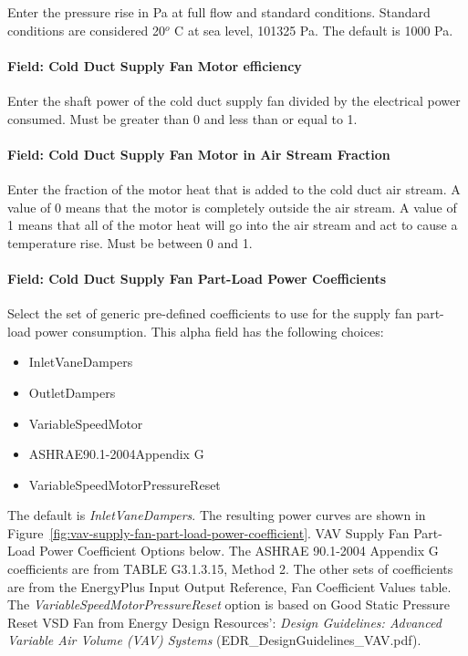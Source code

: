 Enter the pressure rise in Pa at full flow and standard conditions. Standard conditions are considered 20\(^{o}\) C at sea level, 101325 Pa. The default is 1000 Pa.

\paragraph{Field: Cold Duct Supply Fan Motor efficiency}\label{field-cold-duct-supply-fan-motor-efficiency}

Enter the shaft power of the cold duct supply fan divided by the electrical power consumed. Must be greater than 0 and less than or equal to 1.

\paragraph{Field: Cold Duct Supply Fan Motor in Air Stream Fraction}\label{field-cold-duct-supply-fan-motor-in-air-stream-fraction}

Enter the fraction of the motor heat that is added to the cold duct air stream. A value of 0 means that the motor is completely outside the air stream. A value of 1 means that all of the motor heat will go into the air stream and act to cause a temperature rise. Must be between 0 and 1.

\paragraph{Field: Cold Duct Supply Fan Part-Load Power Coefficients}\label{field-cold-duct-supply-fan-part-load-power-coefficients}

Select the set of generic pre-defined coefficients to use for the supply fan part-load power consumption. This alpha field has the following choices:

\begin{itemize}
\item
  InletVaneDampers
\item
  OutletDampers
\item
  VariableSpeedMotor
\item
  ASHRAE90.1-2004Appendix G
\item
  VariableSpeedMotorPressureReset
\end{itemize}

The default is \emph{InletVaneDampers}. The resulting power curves are shown in Figure~\ref{fig:vav-supply-fan-part-load-power-coefficient}. VAV Supply Fan Part-Load Power Coefficient Options below. The ASHRAE 90.1-2004 Appendix G coefficients are from TABLE G3.1.3.15, Method 2. The other sets of coefficients are from the EnergyPlus Input Output Reference, Fan Coefficient Values table. The \emph{VariableSpeedMotorPressureReset} option is based on Good Static Pressure Reset VSD Fan from Energy Design Resources': \emph{Design Guidelines: Advanced Variable Air Volume (VAV) Systems} (EDR\_DesignGuidelines\_VAV.pdf).

